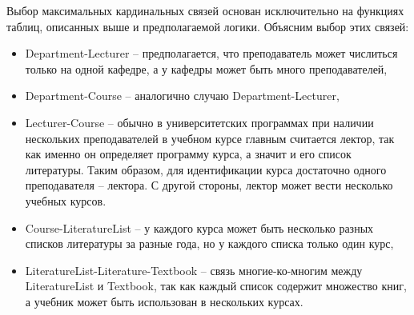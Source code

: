 Выбор максимальных кардинальных связей основан исключительно на функциях таблиц, описанных выше и предполагаемой
логики. Объясним выбор этих связей:

\begin{itemize}
    \item Department-Lecturer -- предполагается, что преподаватель может числиться только на одной кафедре, а у кафедры 
    может быть много преподавателей,
    \item Department-Course -- аналогично случаю Department-Lecturer,
    \item Lecturer-Course -- обычно в университетских программах при наличии нескольких преподавателей в учебном
    курсе главным считается лектор, так как именно он определяет программу курса, а значит и его список литературы. 
    Таким образом, для идентификации курса достаточно одного преподавателя -- лектора. С другой стороны, лектор может
    вести несколько учебных курсов.
    \item Course-LiteratureList -- у каждого курса может быть несколько разных списков литературы за разные года, но
    у каждого списка только один курс,
    \item LiteratureList-Literature-Textbook -- связь многие-ко-многим между LiteratureList и Textbook, так как
    каждый список содержит множество книг, а учебник может быть использован в нескольких курсах.
\end{itemize}